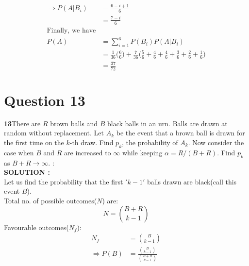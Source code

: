 \documentclass{article}
\begin{document}
\begin{align*}
    \Rightarrow P(A|B_i) &= \frac{6-i+1}{6}\\
    &= \frac{7-i}{6}\\
    \text{Finally, we have}\\
    P(A)&=\sum^6_{i=1} P(B_i)P(A|B_i)\\
    &= \frac{1}{36}\Big(\frac{6}{6}\Big)+\frac{7}{36}\Big(\frac{5}{6}+\frac{4}{6}+\frac{4}{6}+\frac{3}{6}+\frac{2}{6}+\frac{1}{6}\Big)\\
    &=\frac{37}{72}
\end{align*}
\section{Question 13}
\label{Q13}
\textbf{13}There are $R$ brown balls and $B$ black balls in an urn. Balls are drawn at random without replacement. Let $A_k$ be the event that a brown ball is drawn for the first time on the $k$-th draw. Find $p_k$, the probability of $A_k$. Now consider the case when $B$ and $R$ are increased to $\infty$ while keeping $\alpha = R/(B + R).$ Find $p_k$ as $B + R \rightarrow \infty$. : \\

\hspace{1em} \large{\textbf{SOLUTION :}} \\
Let us find the probability that the first $'k-1'$ balls drawn are black(call this event $B$).\\
Total no. of possible outcomes($N$) are:
$$N = {{B+R}\choose {k-1}}$$
Favourable outcomes($N_f$):
\begin{align*}
    N_f &= {B\choose {k-1}}\\
\Rightarrow 
P(B)&=\frac{{B\choose {k-1}}}{{{B+R}\choose {k-1}}}
\end{align*}
\end{document}
